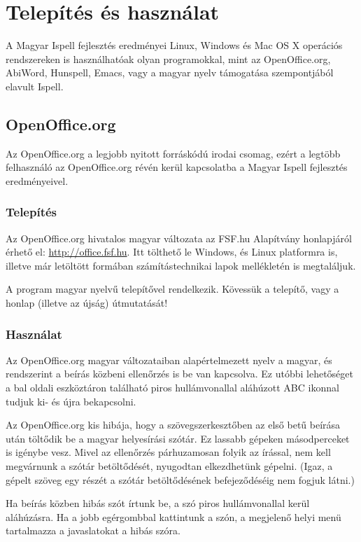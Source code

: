 
\chapter{Telepítés és használat}

A Magyar Ispell fejlesztés eredményei Linux, Windows és Mac OS X
operációs rendszereken is használhatóak olyan programokkal,
mint az OpenOffice.org, AbiWord, Hunspell, Emacs, vagy a magyar nyelv
támogatása szempontjából elavult Ispell.

\section{OpenOffice.org}

Az OpenOffice.org a legjobb
nyitott forráskódú irodai csomag, ezért a legtöbb felhasználó
az OpenOffice.org révén kerül kapcsolatba a Magyar Ispell
fejlesztés eredményeivel.

\subsection{Telepítés}

Az OpenOffice.org hivatalos magyar változata az FSF.hu Alapítvány
honlapjáról érhető el: \url{http://office.fsf.hu}.
Itt tölthető le Windows, és Linux platformra is, illetve
már letöltött formában számítástechnikai lapok
mellékletén is megtaláljuk.

A program magyar nyelvű telepítővel rendelkezik.
Kövessük a telepítő, vagy a honlap (illetve az újság)
útmutatását!

\subsection{Használat}

Az OpenOffice.org magyar változataiban alapértelmezett
nyelv a magyar, és rendszerint a beírás közbeni
ellenőrzés is be van kapcsolva. Ez utóbbi lehetőséget
a bal oldali eszköztáron található piros hullámvonallal aláhúzott \textsc{ABC} ikonnal
tudjuk ki- és újra bekapcsolni.

Az OpenOffice.org kis hibája, hogy a szövegszerkesztőben az
első betű beírása után töltődik be a magyar helyesírási
szótár. Ez lassabb gépeken másodperceket is igénybe vesz.
Mivel az ellenőrzés párhuzamosan folyik az írással, nem
kell megvárnunk a szótár betöltődését, nyugodtan elkezdhetünk gépelni.
(Igaz, a gépelt szöveg egy részét a szótár betöltődésének befejeződéséig
nem fogjuk látni.)

Ha beírás közben hibás szót írtunk be, a szó piros hullámvonallal
kerül aláhúzásra. Ha a jobb egérgombbal kattintunk a szón, a megjelenő
helyi menü tartalmazza a javaslatokat a hibás szóra.

